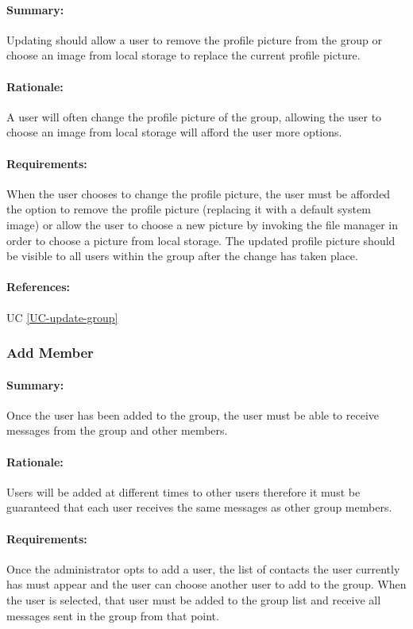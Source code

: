 \documentclass[11pt]{article}
\begin{document}
\paragraph{Summary:}
Updating should allow a user to remove the profile picture from the group or choose an image from local storage to replace the current profile picture.
\paragraph{Rationale:}
A user will often change the profile picture of the group, allowing the user to choose an image from local storage will afford the user more options.
\paragraph{Requirements:}
When the user chooses to change the profile picture, the user must be afforded the option to remove the profile picture (replacing it with a default system image) or allow the user to choose a new picture by invoking the file manager in order to choose a picture from local storage. The updated profile picture should be visible to all users within the group after the change has taken place.
\paragraph{References:} UC \ref{UC-update-group}
\subsubsection{Add Member} \label{FR-add-member}
\paragraph{Summary:}
Once the user has been added to the group, the user must be able to receive messages from the group and other members.
\paragraph{Rationale:}
Users will be added at different times to other users therefore it must be guaranteed that each user receives the same messages as other group members.
\paragraph{Requirements:}
Once the administrator opts to add a user, the list of contacts the user currently has must appear and the user can choose another user to add to the group. When the user is selected, that user must be added to the group list and receive all messages sent in the group from that point.
\end{document}
